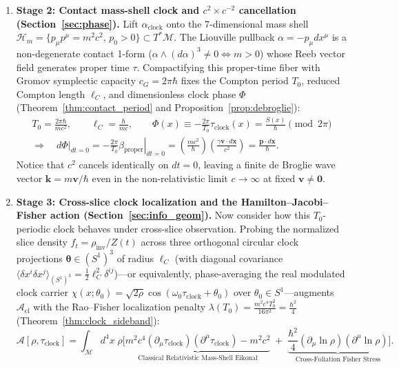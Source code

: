 \documentclass[11pt, a4paper]{article}
\theoremstyle{definition}
\begin{document}
\begin{enumerate}[label=\textbf{\arabic*.}, leftmargin=0.95cm, itemsep=0.55em]
    \item \textbf{Stage 2: Contact mass-shell clock and $c^2 \times c^{-2}$ cancellation (Section~\ref{sec:phase}).} Lift $\alpha_{\text{clock}}$ onto the 7-dimensional mass shell $\mathcal{H}_m = \{p_\mu p^\mu = m^2 c^2,\, p_0 > 0\} \subset T^*\mathcal{M}$. The Liouville pullback $\alpha = -p_\mu dx^\mu$ is a non-degenerate contact 1-form ($\alpha\wedge(d\alpha)^3 \neq 0 \iff m > 0$) whose Reeb vector field generates proper time $\tau$. Compactifying this proper-time fiber with Gromov symplectic capacity $c_G = 2\pi\hbar$ \cite{Gromov1985} fixes the Compton period $T_0$, reduced Compton length $\ell_C$, and dimensionless clock phase $\Phi$ (Theorem~\ref{thm:contact_period} and Proposition~\ref{prop:debroglie}):
    \begin{gather*}
    T_0 = \frac{2\pi\hbar}{mc^2}, \qquad \ell_C = \frac{\hbar}{mc}, \qquad \Phi(x) \equiv -\frac{2\pi}{T_0}\tau_{\text{clock}}(x) = \frac{S(x)}{\hbar} \pmod{2\pi} \\
    \Longrightarrow\quad \left.d\Phi\right|_{dt=0} = -\frac{2\pi}{T_0}\left.\beta_{\text{proper}}\right|_{dt=0} = \left(\frac{mc^2}{\hbar}\right)\!\left(\frac{\gamma\mathbf{v}\cdot d\mathbf{x}}{c^2}\right) = \frac{\mathbf{p}\cdot d\mathbf{x}}{\hbar}.
    \end{gather*}
    Notice that $c^2$ cancels identically on $dt = 0$, leaving a finite de Broglie wave vector $\mathbf{k} = m\mathbf{v}/\hbar$ even in the non-relativistic limit $c \to \infty$ at fixed $\mathbf{v} \neq \mathbf{0}$.

    \item \textbf{Stage 3: Cross-slice clock localization and the Hamilton--Jacobi--Fisher action (Section~\ref{sec:info_geom}).} Now consider how this $T_0$-periodic clock behaves under cross-slice observation. Probing the normalized slice density $f_t = \rho_{\text{inv}}/Z(t)$ across three orthogonal circular clock projections $\boldsymbol{\theta} \in (S^1)^3$ of radius $\ell_C$ (with diagonal covariance $\langle\delta x^i \delta x^j\rangle_{(S^1)^3} = \frac{1}{2}\ell_C^2\delta^{ij}$)---or equivalently, phase-averaging the real modulated clock carrier $\chi(x;\theta_0) = \sqrt{2\rho}\cos(\omega_0\tau_{\text{clock}} + \theta_0)$ over $\theta_0 \in S^1$---augments $\mathcal{A}_{\text{cl}}$ with the Rao--Fisher localization penalty $\lambda(T_0) = \frac{m^2 c^4 T_0^2}{16\pi^2} = \frac{\hbar^2}{4}$ (Theorem~\ref{thm:clock_sideband}):
    \[
    \mathcal{A}[\rho, \tau_{\text{clock}}] = \int_{\mathcal{M}} d^4x\;\rho\Bigg[\underbrace{m^2 c^4(\partial_\mu\tau_{\text{clock}})(\partial^\mu\tau_{\text{clock}}) - m^2 c^2}_{\text{Classical Relativistic Mass-Shell Eikonal}} \;+\; \underbrace{\frac{\hbar^2}{4}(\partial_\mu\ln\rho)(\partial^\mu\ln\rho)}_{\text{Cross-Foliation Fisher Stress}}\Bigg].
    \]


\end{enumerate}
\end{document}
